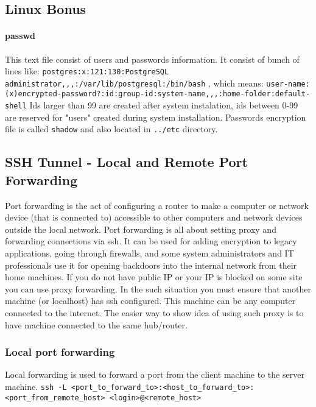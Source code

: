 \documentclass{article}[12pt]
\begin{document}
\subsection{Linux Bonus}
\paragraph{passwd} This text file consist of users and passwords information.
It consist of bunch of lines like: \newline
\texttt{postgres:x:121:130:PostgreSQL administrator,,,:/var/lib/postgresql:/bin/bash} , which means:
\texttt{user-name:(x)encrypted-password?:id:group-id:system-name,,,:home-folder:default-shell} \newline
Ids larger than 99 are created after system instalation, ids between 0-99 are reserved for "users" created during system installation.
Passwords encryption file is called \texttt{shadow} and also located in \texttt{../etc} directory.





\subsection{SSH Tunnel - Local and Remote Port Forwarding}
Port forwarding is the act of configuring a router to make a computer or network device (that is connected to) accessible to other computers and network devices outside the local network.
Port forwarding is all about setting proxy and forwarding connections via ssh.
It can be used for adding encryption to legacy applications, going through firewalls, and some system administrators and IT professionals use it for opening backdoors into the internal network from their home machines.
If you do not have public IP or your IP is blocked on some site you can use proxy forwarding.
In the such situation you must ensure that another machine (or localhost) has ssh configured.
This machine can be any computer connected to the internet.
The easier way to show idea of using such proxy is to have machine connected to the same hub/router.

\subsubsection{Local port forwarding}
Local forwarding is used to forward a port from the client machine to the server machine.
\texttt{ssh -L <port\_to\_forward\_to>:<host\_to\_forward\_to>:<port\_from\_remote\_host> <login>@<remote\_host>} \newline\newline
\end{document}
